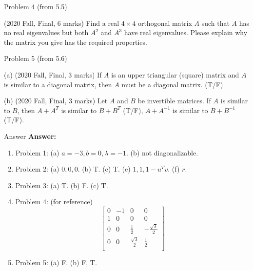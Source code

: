 \documentclass{beamer}
\begin{document}
\begin{frame}{Problem 4 (from 5.5)}
\begin{example}
    (2020 Fall, Final, 6 marks) Find a real $4\times 4$ orthogonal matrix $A$ such that $A$ has no real eigenvalues but both $A^2$ and $A^3$ have real eigenvalues. Please explain why the matrix you give has the required properties.
\end{example}
\end{frame}

\begin{frame}{Problem 5 (from 5.6)}
\begin{example}

    (a) (2020 Fall, Final, 3 marks) If $A$ is an upper triangular (square) matrix and $A$ is similar to a diagonal matrix, then $A$ must be a diagonal matrix. (T/F)

    \vspace{3pt}
    (b) (2020 Fall, Final, 3 marks) Let $A$ and $B$ be invertible matrices. If $A$ is similar to $B$, then $A+A^T$ is similar to $B+B^T$ (T/F), $A+A^{-1}$ is similar to $B+B^{-1}$ (T/F).

\end{example}
\end{frame}

\begin{frame}{Answer}
\textbf{Answer:}
\begin{enumerate}
    \item Problem 1: (a) $a=-3, b=0, \lambda=-1$. (b) not diagonalizable.
    \item Problem 2: (a) $0, 0, 0$. (b) T. (c) T. (e) $1, 1, 1-u^Tv$. (f) $r$.
    \item Problem 3: (a) T. (b) F. (c) T.
    \item Problem 4: (for reference)
    \begin{equation*}
        \left[ \begin{matrix}
            0&		-1&		0&		0\\
            1&		0&		0&		0\\
            0&		0&		\frac{1}{2}&		-\frac{\sqrt{3}}{2}\\
            0&		0&		\frac{\sqrt{3}}{2}&		\frac{1}{2}\\
        \end{matrix} \right]
    \end{equation*}
    \item Problem 5: (a) F. (b) F, T.
\end{enumerate}
\end{frame}
\end{document}
